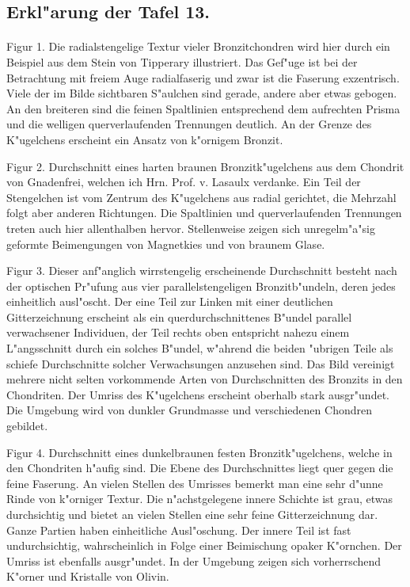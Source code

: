 \documentclass[a4paper, 11pt, oneside, polutonikogreek, german]{article}
\begin{document}
\subsection{Erkl"arung der Tafel 13.}
\paragraph{}
Figur 1. Die radialstengelige Textur vieler Bronzitchondren wird hier durch ein Beispiel aus dem Stein von Tipperary illustriert. Das Gef"uge ist bei der Betrachtung mit freiem Auge radialfaserig und zwar ist die Faserung exzentrisch. Viele der im Bilde sichtbaren S"aulchen sind gerade, andere aber etwas gebogen. An den breiteren sind die feinen Spaltlinien entsprechend dem aufrechten Prisma und die welligen querverlaufenden Trennungen deutlich. An der Grenze des K"ugelchens erscheint ein Ansatz von k"ornigem Bronzit.

Figur 2. Durchschnitt eines harten braunen Bronzitk"ugelchens aus dem Chondrit von Gnadenfrei, welchen ich Hrn. Prof. v. Lasaulx verdanke. Ein Teil der Stengelchen ist vom Zentrum des K"ugelchens aus radial gerichtet, die Mehrzahl folgt aber anderen Richtungen. Die Spaltlinien und querverlaufenden Trennungen treten auch hier allenthalben hervor. Stellenweise zeigen sich unregelm"a"sig geformte Beimengungen von Magnetkies und von braunem Glase.

Figur 3. Dieser anf"anglich wirrstengelig erscheinende Durchschnitt besteht nach der optischen Pr"ufung aus vier parallelstengeligen Bronzitb"undeln, deren jedes einheitlich ausl"oscht. Der eine Teil zur Linken mit einer deutlichen Gitterzeichnung erscheint als ein querdurchschnittenes B"undel parallel verwachsener Individuen, der Teil rechts oben entspricht nahezu einem L"angsschnitt durch ein solches B"undel, w"ahrend die beiden "ubrigen Teile als schiefe Durchschnitte solcher Verwachsungen anzusehen sind. Das Bild vereinigt mehrere nicht selten vorkommende Arten von Durchschnitten des Bronzits in den Chondriten. Der Umriss des K"ugelchens erscheint oberhalb stark ausgr"undet. Die Umgebung wird von dunkler Grundmasse und verschiedenen Chondren gebildet.

Figur 4. Durchschnitt eines dunkelbraunen festen Bronzitk"ugelchens, welche in den Chondriten h"aufig sind. Die Ebene des Durchschnittes liegt quer gegen die feine Faserung. An vielen Stellen des Umrisses bemerkt man eine sehr d"unne Rinde von k"orniger Textur. Die n"achstgelegene innere Schichte ist grau, etwas durchsichtig und bietet an vielen Stellen eine sehr feine Gitterzeichnung dar. Ganze Partien haben einheitliche Ausl"oschung. Der innere Teil ist fast undurchsichtig, wahrscheinlich in Folge einer Beimischung opaker K"ornchen. Der Umriss ist ebenfalls ausgr"undet. In der Umgebung zeigen sich vorherrschend K"orner und Kristalle von Olivin.
\clearpage
\end{document}
